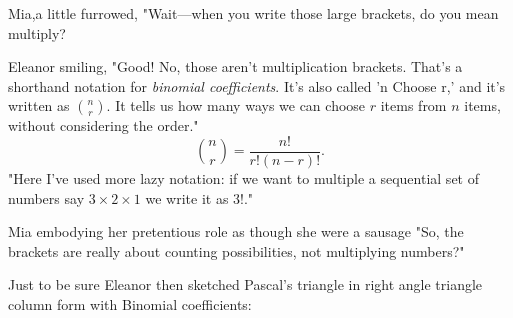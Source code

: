 Mia,a little furrowed, "Wait—when you write those large brackets, do you mean multiply? 

Eleanor smiling, "Good! No, those aren’t multiplication brackets. That’s a shorthand notation for \textit{binomial coefficients}. It’s also called 'n Choose r,' and it’s written as \( \binom{n}{r} \).  It tells us how many ways we can choose \( r \) items from \( n \) items, without considering the order."
\[
\binom{n}{r} = \frac{n!}{r!(n-r)!}.
\]
"Here I've used more lazy notation: if we want to multiple a sequential set of numbers say \(3\times 2\times 1\) we write it as \(3!\)."

Mia embodying her pretentious role as though she were a sausage  "So, the brackets are really about counting possibilities, not multiplying numbers?"

Just to be sure Eleanor then sketched Pascal’s triangle in right angle triangle column form with Binomial coefficients:
 
